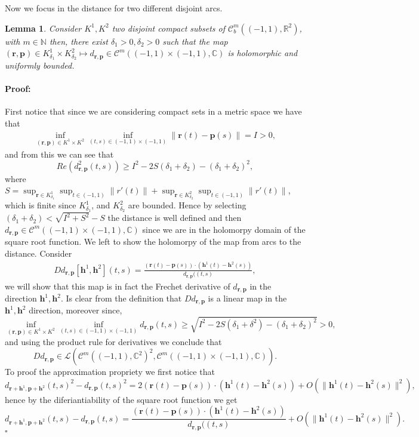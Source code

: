 \documentclass{article}
\newtheorem{lemma}[theorem]{Lemma}
\newenvironment{proof}{\paragraph{Proof:}}{\hfill$\square$}
\newcommand{\IC}{{\mathbb C}}
\newcommand{\IN}{{\mathbb N}}
\newcommand{\IR}{{\mathbb R}}
\newcommand{\bp}{{\bm p}}
\newcommand{\cmspace}[3]{\mathcal{C}^{#1} \left( #2, #3 \right)}
\newcommand{\rgeo}[1]{\mathcal{C}_b^{#1}\left( (-1,1), \IR^2 \right)}
\newcommand{\bh}{\bm{h}}
\newcommand{\br}{\bm{r}}
\begin{document}
Now we focus in the distance for two different disjoint arcs. 
\begin{lemma}
\label{lemma:dcross}
Consider $K^1,K^2$ two disjoint compact subsets of $\rgeo{m}$, with  $m \in \IN$
then, there exist $\delta_1 >0 , \delta_2 >0$ such that the map $(\br, \bp) \in K^1_{\delta_1} \times K^2_{\delta_2} \mapsto d_{\br, \bp} \in \cmspace{m}{(-1,1)\times(-1,1)}{\IC}$ is holomorphic and uniformly bounded. 
\end{lemma}
\begin{proof}
First notice that since we are considering compact sets in a metric space we have that
\begin{align*}
\inf_{(\br,\bp) \in K^1 \times K^2} \inf_{(t,s) \in (-1,1)\times(-1,1)}
 \| \br(t) - \bp(s) \| = I > 0,
\end{align*}
and from this we can see that
$$
Re(d_{\br,\bp}^2(t,s)) \geq I^2 -2 S(\delta_1 + \delta_2) - ( \delta_1 + \delta_2)^2,$$
where $S = \sup_{\br \in K^1_{\delta_1}} \sup_{t \in (-1,1)} \| r'(t)\| +
\sup_{\br \in K^2_{\delta_2}} \sup_{t \in (-1,1)} \| r'(t)\|$, which is finite since $K^1_{\delta_1}$, and $K^2_{\delta_2}$ are bounded. Hence by selecting $(\delta_1+\delta_2) < \sqrt{I^2+S^2}-S$ the distance is well defined and then $d_{\br, \bp } \in \cmspace{m}{(-1,1)\times (-1,1)}{\IC}$ since we are in the holomorpy domain of the square root function. We left to show the holomorpy of the map from arcs to the distance. Consider 
\begin{align*}
D d_{\br,\bp}[\bh^1,\bh^2](t,s) = \frac{(\br(t) -\bp(s))\cdot(\bh^1(t)- \bh^2(s))}{d_{\br,\bp}((t,s)},
\end{align*}
we will show that this map is in fact the Frechet derivative of $d_{\br,\bp}$ in the direction $\bh^1,\bh^2$. Is clear from the definition that $D d_{\br,\bp}$ is a linear map in the $\bh^1,\bh^2$ direction, moreover since, 
$$\inf_{(\br,\bp) \in K^1 \times K^2} \inf_{(t,s) \in (-1,1)\times(-1,1)}
d_{\br,\bp}(t,s) \geq \sqrt{I^2 -2S (\delta_1 +\delta^2)-(\delta_1 +\delta_2)^2}>0,$$
and using the product rule for derivatives we conclude that $$D d_{\br,\bp}\in \mathcal{L}(\cmspace{m}{(-1,1)}{\IC^2}^2,
\cmspace{m}{(-1,1) \times (-1,1)}{\IC}).$$ To proof the approximation propriety we first notice that 
$$d_{\br+ \bh^1, \bp+\bh^2}(t,s)^2 - d_{\br,\bp}(t,s)^2 = 2 (\br(t)-\bp(s))\cdot (\bh^1(t)- \bh^2(s)) + O(\| \bh^1(t)- \bh^2(s)\|^2),$$
hence by the diferiantiability of the square root function we get 
$$
d_{\br+ \bh^1, \bp+\bh^2}(t,s) - d_{\br,\bp}(t,s) = \frac{(\br(t) -\bp(s))\cdot(\bh^1(t)- \bh^2(s))}{d_{\br,\bp}((t,s)}  + O( \| \bh^1(t)- \bh^2(s)\|^2).
$$
\end{proof}
\end{document}
